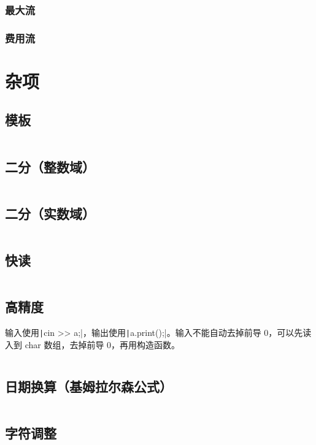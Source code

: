 \documentclass[a4paper, twoside]{article}
\begin{document}
    \subsubsection{最大流}

    \subsubsection{费用流}


\newpage
\section{杂项}
\subsection{模板}
\inputminted{cpp}{../src/杂项/模板.cpp}

\subsection{二分（整数域）}
\inputminted{cpp}{../src/杂项/二分（整数域）.cpp}

\subsection{二分（实数域）}
\inputminted{cpp}{../src/杂项/二分（实数域）.cpp}

\subsection{快读}
\inputminted{cpp}{../src/杂项/快读.cpp}

\subsection{高精度}
输入使用\texttt|cin >> a;|，输出使用\texttt|a.print();|。输入不能自动去掉前导 0，可以先读入到 char 数组，去掉前导 0，再用构造函数。
\inputminted{cpp}{../src/杂项/高精度.cpp}

\subsection{日期换算（基姆拉尔森公式）}
\inputminted{cpp}{../src/杂项/日期换算（基姆拉尔森公式）.cpp}

\subsection{字符调整}
\inputminted{cpp}{../src/杂项/字符调整.cpp}
\end{document}
